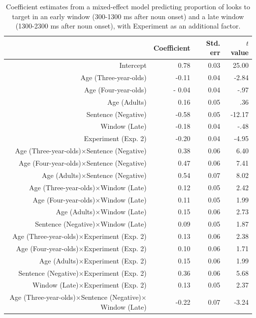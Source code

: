 \documentclass[man]{apa2}
\begin{document}
\begin{table}
\label{tab:bothmodel}
\caption{Coefficient estimates from a mixed-effect model predicting proportion of looks to target in an early window (300-1300 ms after noun onset) and a late window (1300-2300 ms after noun onset), with Experiment as an additional factor.}
\begin{center}
\small\addtolength{\tabcolsep}{-5pt}
\begin{tabular}{rrrr}
  \hline
 & Coefficient  & Std. err & $t$ value \\ 
  \hline
Intercept & 0.78 & 0.03 & 25.00 \\ 
  Age (Three-year-olds) & -0.11 & 0.04 & -2.84 \\ 
  Age (Four-year-olds)&- 0.04 & 0.04 &  -.97\\ 
  Age (Adults) & 0.16 & 0.05 & .36 \\ 
  Sentence (Negative) & -0.58 & 0.05 & -12.17 \\ 
  Window (Late)  & -0.18 & 0.04 & -.48 \\ 
  Experiment (Exp. 2) & -0.20 & 0.04 & -4.95 \\ 
  Age (Three-year-olds)$\times$Sentence (Negative) & 0.38 & 0.06 & 6.40 \\ 
  Age (Four-year-olds)$\times$Sentence (Negative) & 0.47 & 0.06 & 7.41 \\ 
  Age (Adults)$\times$Sentence (Negative) & 0.54 & 0.07 & 8.02 \\ 
  Age (Three-year-olds)$\times$Window (Late)  & 0.12 & 0.05 & 2.42 \\ 
  Age (Four-year-olds)$\times$Window (Late) & 0.11 & 0.05 & 1.99 \\ 
  Age (Adults)$\times$Window (Late)  & 0.15 & 0.06 & 2.73 \\ 
  Sentence (Negative)$\times$Window (Late)  & 0.09 & 0.05 & 1.87 \\ 
  Age (Three-year-olds)$\times$Experiment (Exp. 2)  & 0.13 & 0.06 & 2.38 \\ 
  Age (Four-year-olds)$\times$Experiment (Exp. 2)  & 0.10 & 0.06 & 1.71 \\ 
  Age (Adults)$\times$Experiment (Exp. 2) & 0.15 & 0.06 & 1.99 \\ 
  Sentence (Negative)$\times$Experiment (Exp. 2)& 0.36 & 0.06 & 5.68 \\ 
  Window (Late)$\times$Experiment (Exp. 2)  & 0.13 & 0.05 & 2.37 \\ 
  Age (Three-year-olds)$\times$Sentence (Negative)$\times$Window (Late) & -0.22 & 0.07 & -3.24 \\ 

\end{tabular}
\end{center}
\end{table}
\end{document}
